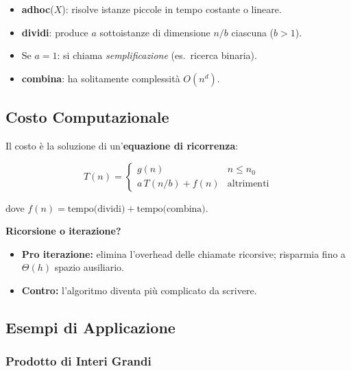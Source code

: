 \documentclass[a4paper, 11pt]{article}
\theoremstyle{definition}
\theoremstyle{remark}
\theoremstyle{remark}
\newenvironment{nota}{%
	\begin{tcolorbox}[
		colback=codebg,
		colframe=primary,
		fonttitle=\bfseries,
		title=Nota,
		left=6pt, right=6pt, top=4pt, bottom=4pt
		]
	}{%
	\end{tcolorbox}
}
\begin{document}
	\begin{softnote}
		\begin{itemize}
			\item \textbf{adhoc}($X$): risolve istanze piccole in tempo
			costante o lineare.
			\item \textbf{dividi}: produce $a$ sottoistanze di dimensione
			$n/b$ ciascuna ($b>1$).
			\item Se $a=1$: si chiama \textit{semplificazione} (es.\ ricerca binaria).
			\item \textbf{combina}: ha solitamente complessità $O(n^d)$.
		\end{itemize}
	\end{softnote}
	
	\subsection{Costo Computazionale}
	
	Il costo è la soluzione di un'\textbf{equazione di ricorrenza}:
	
	\[
	T(n) =
	\begin{cases}
		g(n)           & n \le n_0 \\
		a\,T(n/b)+f(n) & \text{altrimenti}
	\end{cases}
	\]
	
	dove $f(n) = \text{tempo(dividi)} + \text{tempo(combina)}$.
	
	\begin{nota}
		\textbf{Ricorsione o iterazione?}
		\begin{itemize}
			\item \textbf{Pro iterazione:} elimina l'overhead delle chiamate
			ricorsive; risparmia fino a $\Theta(h)$ spazio ausiliario.
			\item \textbf{Contro:} l'algoritmo diventa più complicato da scrivere.
		\end{itemize}
	\end{nota}
	
	\subsection{Esempi di Applicazione}
	
	\subsubsection{Prodotto di Interi Grandi}
	
\end{document}
